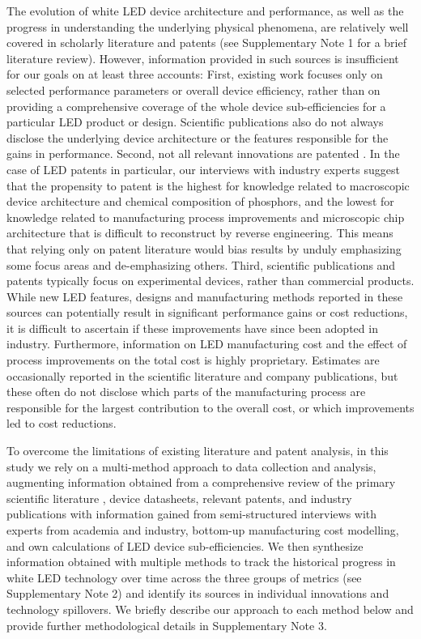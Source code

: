 \documentclass[parskip=full]{article}
\begin{document}
The evolution of white LED device architecture and performance, as well as the progress in understanding the underlying physical phenomena, are relatively well covered in scholarly literature and patents (see Supplementary Note 1 for a brief literature review). However, information provided in such sources is insufficient for our goals on at least three accounts: First, existing work focuses only on selected performance parameters or overall device efficiency, rather than on providing a comprehensive coverage of the whole device sub-efficiencies for a particular LED product or design. Scientific publications also do not always disclose the underlying device architecture or the features responsible for the gains in performance. Second, not all relevant innovations are patented \cite{Pakes_1980,Fontana_2013}. In the case of LED patents in particular, our interviews with industry experts suggest that the propensity to patent is the highest for knowledge related to macroscopic device architecture and chemical composition of phosphors, and the lowest for knowledge related to manufacturing process improvements and microscopic chip architecture that is difficult to reconstruct by reverse engineering. This means that relying only on patent literature would bias results by unduly emphasizing some focus areas and de-emphasizing others. Third, scientific publications and patents typically focus on experimental devices, rather than commercial products. While new LED features, designs and manufacturing methods reported in these sources can potentially result in significant performance gains or cost reductions, it is difficult to ascertain if these improvements have since been adopted in industry. Furthermore, information on LED manufacturing cost and the effect of process improvements on the total cost is highly proprietary. Estimates are occasionally reported in the scientific literature and company publications, but these often do not disclose which parts of the manufacturing process are responsible for the largest contribution to the overall cost, or which improvements led to cost reductions.

To overcome the limitations of existing literature and patent analysis, in this study we rely on a multi-method approach to data collection and analysis, augmenting information obtained from a comprehensive review of the primary scientific literature \cite{Haddaway_2014}, device datasheets, relevant patents, and industry publications with information gained from semi-structured interviews with experts from academia and industry, bottom-up manufacturing cost modelling, and own calculations of LED device sub-efficiencies. We then synthesize information obtained with multiple methods to track the historical progress in white LED technology over time across the three groups of metrics (see Supplementary Note 2) and identify its sources in individual innovations and technology spillovers. We briefly describe our approach to each method below and provide further methodological details in Supplementary Note 3. 
\end{document}
